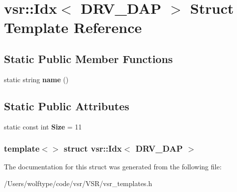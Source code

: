 \hypertarget{structvsr_1_1_idx_3_01_d_r_v___d_a_p_01_4}{\section{vsr\-:\-:Idx$<$ D\-R\-V\-\_\-\-D\-A\-P $>$ Struct Template Reference}
\label{structvsr_1_1_idx_3_01_d_r_v___d_a_p_01_4}
}
\subsection*{Static Public Member Functions}
\begin{DoxyCompactItemize}
\item 
\hypertarget{structvsr_1_1_idx_3_01_d_r_v___d_a_p_01_4_a79b8d93cbc963cad60a5290e6a387b67}{static string {\bfseries name} ()}\label{structvsr_1_1_idx_3_01_d_r_v___d_a_p_01_4_a79b8d93cbc963cad60a5290e6a387b67}

\end{DoxyCompactItemize}
\subsection*{Static Public Attributes}
\begin{DoxyCompactItemize}
\item 
\hypertarget{structvsr_1_1_idx_3_01_d_r_v___d_a_p_01_4_a4df6050228869d8b2f020c581d3695e4}{static const int {\bfseries Size} = 11}\label{structvsr_1_1_idx_3_01_d_r_v___d_a_p_01_4_a4df6050228869d8b2f020c581d3695e4}

\end{DoxyCompactItemize}
\subsubsection*{template$<$$>$ struct vsr\-::\-Idx$<$ D\-R\-V\-\_\-\-D\-A\-P $>$}



The documentation for this struct was generated from the following file\-:\begin{DoxyCompactItemize}
\item 
/\-Users/wolftype/code/vsr/\-V\-S\-R/vsr\-\_\-templates.\-h\end{DoxyCompactItemize}
